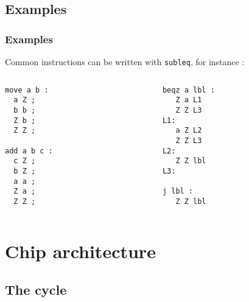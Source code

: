 \documentclass[slidestop]{beamer}
\begin{document}
\subsection{Examples}
\begin{frame}[fragile]
    \frametitle{Examples}
Common instructions can be written with \texttt{subleq}, for instance :

\begin{columns}[t]
    \begin{column}[T]{5cm}
\begin{lstlisting}
move a b :
  a Z ;
  b b ;
  Z b ;
  Z Z ;

add a b c :
  c Z ;
  b Z ;
  a a ;
  Z a ;
  Z Z ;
\end{lstlisting}
    \end{column}
\begin{column}[T]{5cm}
\begin{lstlisting}
beqz a lbl :
   Z a L1
   Z Z L3
L1:
   a Z L2
   Z Z L3
L2:
   Z Z lbl
L3:

j lbl :
   Z Z lbl
\end{lstlisting}
\end{column}
\end{columns}
\end{frame}

\section{Chip architecture}
\subsection{The cycle}
\end{document}
